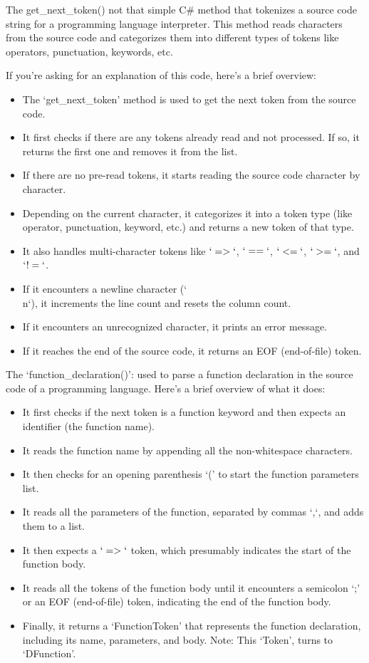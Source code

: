 The \hbox{get\_next\_token{()}} not that simple C\# method that tokenizes a source code string for a programming language interpreter. This method reads characters from the source code and categorizes them into different types of tokens like operators, punctuation, keywords, etc.

If you're asking for an explanation of this code, here's a brief overview:
\begin{itemize}
\item  The `get\_next\_token' method is used to get the next token from the source code.
\item  It first checks if there are any tokens already read and not processed. If so, it returns the first one and removes it from the list.
\item  If there are no pre-read tokens, it starts reading the source code character by character.
\item  Depending on the current character, it categorizes it into a token type (like operator, punctuation, keyword, etc.) and returns a new token of that type.
\item  It also handles multi-character tokens like $`=>`$, $`==`$, $`<=`$, $`>=`$, and $`!=`$.
\item  If it encounters a newline character (`\\n`), it increments the line count and resets the column count.
\item  If it encounters an unrecognized character, it prints an error message.
\item  If it reaches the end of the source code, it returns an EOF (end-of-file) token.
\end{itemize}

The `function\_declaration{()}': used to parse a function declaration in the source code of a programming language. Here's a brief overview of what it does:
\begin{itemize}
    \item  It first checks if the next token is a function keyword and then expects an identifier (the function name).
    \item  It reads the function name by appending all the non-whitespace characters.
    \item  It then checks for an opening parenthesis `(' to start the function parameters list.
    \item  It reads all the parameters of the function, separated by commas `,`, and adds them to a list.
    \item  It then expects a $`=>`$ token, which presumably indicates the start of the function body.
    \item  It reads all the tokens of the function body until it encounters a semicolon `;' or an EOF (end-of-file) token, indicating the end of the function body.
    \item  Finally, it returns a `FunctionToken' that represents the function declaration, including its name, parameters, and body. Note: This `Token', turns to `DFunction'.
\end{itemize}
